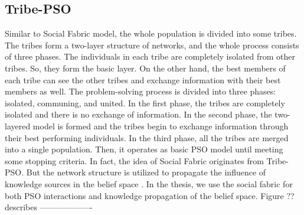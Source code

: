 \subsection{Tribe-PSO}
Similar to Social Fabric model, the whole population is divided into some tribes.  The tribes form a two-layer structure of networks, and the whole process consists of three phases. The individuals in each tribe are completely isolated from other tribes. So, they form the basic layer. On the other hand, the best members of each tribe can see the other tribes and exchange information with their best members as well. The problem-solving process is divided into three phases: isolated, communing, and united. In the first phase, the tribes are completely isolated and there is no exchange of information. In the second phase, the two-layered model is formed and the tribes begin to exchange information through their best performing individuals. In the third phase, all the tribes are merged into a single population. Then, it operates as basic PSO model until meeting some stopping criteria. In fact, the idea of Social Fabric originates from Tribe-PSO. But the network structure is utilized to propagate the influence of knowledge sources in the belief space \cite{chen2006tribe}. In the thesis, we use the social fabric for both PSO interactions and knowledge propagation of the belief space. Figure ?? describes \cdots \newline
\newline ------------------- \newline






